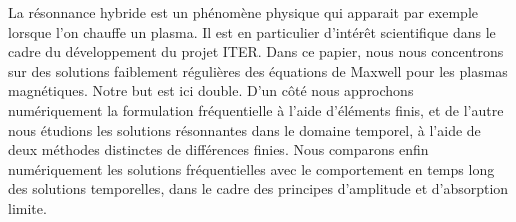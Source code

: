 La r\'esonnance hybride est un ph\'enom\`ene physique qui apparait par exemple lorsque l'on chauffe un plasma.
Il est en particulier d'int\'er\^et scientifique dans le cadre du d\'eveloppement  du projet ITER. Dans ce papier, nous nous concentrons sur des solutions faiblement r\'eguli\`eres des \'equations de Maxwell pour les plasmas magn\'etiques. Notre but est ici double. D'un c\^ot\'e nous 
approchons num\'eriquement la formulation fr\'equentielle \`a l'aide d'\'el\'ements finis,
 et de l'autre nous \'etudions les solutions r\'esonnantes dans le domaine temporel, \`a l'aide de deux m\'ethodes distinctes de diff\'erences finies. Nous comparons enfin num\'eriquement les solutions fr\'equentielles avec le comportement en temps long des solutions temporelles, dans le cadre
des principes d'amplitude et d'absorption limite.

